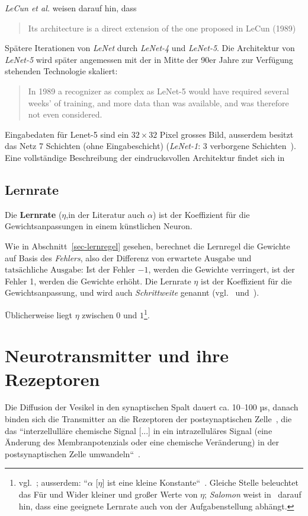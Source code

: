 {\textit{LeCun et al.} weisen darauf hin, dass

\blockquote[{\cite[544]{CBD+89}}]{
    Its architecture is a direct extension of the one proposed in LeCun (1989)
}
\noindent
Spätere Iterationen von \textit{LeNet} durch \textit{LeNet-4} und \textit{LeNet-5}. Die Architektur von \textit{LeNet-5} wird später angemessen mit der in Mitte der 90er Jahre zur Verfügung stehenden Technologie skaliert:

\blockquote[{\cite[15]{CBBH98}}]{
    In 1989 a recognizer as complex as LeNet-5 would have required several weeks' of training, and more data than was available, and was therefore not even considered.
}
\noindent
Eingabedaten für Lenet-5 sind ein $32 \times 32$ Pixel grosses Bild, ausserdem besitzt das Netz 7 Schichten (ohne Eingabeschicht) (\textit{LeNet-1}: 3 verborgene Schichten~\cite[544]{CBD+89}).
Eine vollständige Beschreibung der eindrucksvollen Architektur findet sich in\cite[7 f.]{CBBH98}

\subsection*{Lernrate}
Die \textbf{Lernrate} ($\eta$,in der Literatur auch $\alpha$) ist der Koeffizient für die Gewichtsanpassungen in einem künstlichen Neuron.

Wie in Abschnitt~\ref{sec-lernregel} gesehen, berechnet die Lernregel die Gewichte auf Basis des \textit{Fehlers}, also der Differenz von $\text{erwartete Ausgabe}$ und $\text{tatsächliche Ausgabe}$: Ist der Fehler $-1$, werden die Gewichte verringert, ist der Fehler 1, werden die Gewichte erhöht.
Die Lernrate $\eta$ ist der Koeffizient für die Gewichtsanpassung, und wird auch \textit{Schrittweite} genannt (vgl.~\cite[93]{GBC18} und~\cite[172]{RN09}).

Üblicherweise liegt $\eta$ zwischen $0$ und $1$\footnote{
    vgl.~\cite[61]{Fau94}; ausserdem: ``$\alpha$ [$\eta$] ist eine kleine Konstante``~\cite[172]{RN09}. Gleiche Stelle beleuchtet das Für und Wider kleiner und großer Werte von $\eta$; \textit{Salomon} weist in~\cite[173]{Sal90} darauf hin, dass eine geeignete Lernrate auch von der Aufgabenstellung abhängt.
}.



\section{Neurotransmitter und ihre Rezeptoren}

Die Diffusion der Vesikel in den synaptischen Spalt dauert ca. 10–100 µs, danach binden sich die Transmitter an die Rezeptoren der postsynaptischen Zelle~\cite[96]{HS19a}, die das ``interzellulläre chemische Signal [...] in ein intrazelluläres Signal (eine Änderung des Membranpotenzials oder eine chemische Veränderung) in der postsynaptischen Zelle umwandeln``~\cite[123]{BCP18}.

}

